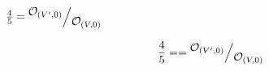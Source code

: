 \documentclass[10pt,a4paper]{article}
\def\quotient#1#2{%
		\raise1ex\hbox{$#1$}\Big/\lower1ex\hbox{$#2$}%
	}
\begin{document}
$\frac{4}{5} = \quotient{{\cal O}_{(V',0)}}{{\cal O}_{(V,0)}}$

\[
	\frac{4}{5} =  = \quotient{{\cal O}_{(V',0)}}{{\cal O}_{(V,0)}}
\]
\end{document}
